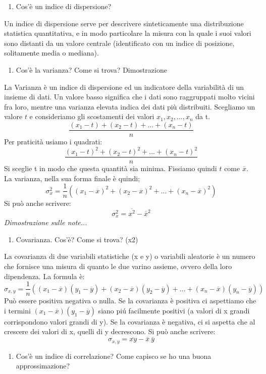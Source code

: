 \begin{enumerate}[resume]\bfseries
	\item Cos'è un indice di dispersione?
\end{enumerate}
Un indice di dispersione serve per descrivere sinteticamente una distribuzione statistica quantitativa, e in modo particolare la misura con la quale i suoi valori sono distanti da un valore centrale (identificato con un indice di posizione, solitamente media o mediana).
\begin{enumerate}[resume]\bfseries
\item Cos'è la varianza? Come si trova? Dimostrazione
\end{enumerate}
La Varianza è un indice di dispersione ed un indicatore della variabilità di un insieme di dati. Un valore basso significa che i dati sono raggruppati molto vicini fra loro, mentre una varianza elevata indica dei dati più distribuiti.
Scegliamo un valore $t$ e consideriamo gli scostamenti dei valori $x_1, x_2,...,x_n$ da t.
\[\frac{(x_1-t) + (x_2 -t) + ... +(x_n -t)}{n}\] Per praticità usiamo i quadrati:
\[\frac{(x_1-t)^2 + (x_2 -t)^2 + ... +(x_n -t)^2}{n}\]
Si sceglie t in modo che questa quantità sia minima. Fissiamo quindi $t$ come $\overline{x}$. La varianza, nella sua forma finale è quindi;
\[\sigma_x^2 = \frac{1}{n} ((x_1-\overline{x})^2 + (x_2 -\overline{x})^2 + ... +(x_n -\overline{x})^2)\]
Si può anche scrivere:
\[\sigma_x^2 = \overline{x^2} - \overline{x}^2\]
\textit{Dimostrazione sulle note...}
\begin{enumerate}[resume]\bfseries
\item Covarianza. Cos'è? Come si trova? (x2)
\end{enumerate}
La covarianza di due variabili statistiche (x e y) o variabili aleatorie è un numero che fornisce una misura di quanto le due varino assieme, ovvero della loro dipendenza.
La formula è:
\[\sigma_{x,y}= \frac{1}{n} ((x_1-\overline{x})(y_1-\overline{y}) + (x_2 -\overline{x})(y_2-\overline{y}) + ... +(x_n -\overline{x})(y_n-\overline{y}))\]
 Può essere positiva negativa o nulla. Se la covarianza è positiva ci aspettiamo che i termini $(x_1-\overline{x})(y_1-\overline{y})$ siano piú facilmente positivi (a valori di x grandi corrispondono valori grandi di y).\newline
 Se la covarianza è negativa, ci si aspetta che al crescere dei valori di x, quelli di y decrescono.
 Si può anche scrivere:
 \[\sigma_{x,y}= \overline{xy} - \overline{x}\:\overline{y}\]
 \begin{enumerate}[resume]\bfseries
\item Cos'è un indice di correlazione? Come capisco se ho una buona approssimazione?
\end{enumerate}
